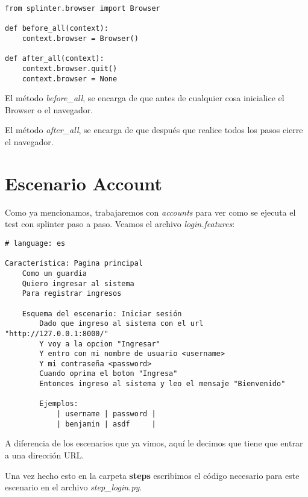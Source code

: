 \begin{verbatim}
from splinter.browser import Browser

def before_all(context):
    context.browser = Browser()

def after_all(context):
    context.browser.quit()
    context.browser = None
\end{verbatim}

El método {\it before\_all}, se encarga de que antes de cualquier cosa inicialice
el Browser o el navegador.

El método {\it after\_all}, se encarga de que después que realice todos los pasos
cierre el navegador.

\section{Escenario Account}
Como ya mencionamos, trabajaremos con {\it accounts} para ver como se ejecuta
el test con splinter paso a paso. Veamos el archivo {\it login.features}:

{\scriptsize
\begin{verbatim}
# language: es

Característica: Pagina principal
    Como un guardia
    Quiero ingresar al sistema
    Para registrar ingresos

    Esquema del escenario: Iniciar sesión
        Dado que ingreso al sistema con el url "http://127.0.0.1:8000/"
        Y voy a la opcion "Ingresar"
        Y entro con mi nombre de usuario <username>
        Y mi contraseña <password>
        Cuando oprima el boton "Ingresa"
        Entonces ingreso al sistema y leo el mensaje "Bienvenido"

        Ejemplos:
            | username | password |
            | benjamin | asdf     |
\end{verbatim}
}

A diferencia de los escenarios que ya vimos, aquí le decimos que tiene que entrar
a una dirección URL.

Una vez hecho esto en la carpeta {\bfseries steps} escribimos el código necesario
para este escenario en el archivo {\it step\_login.py}.

